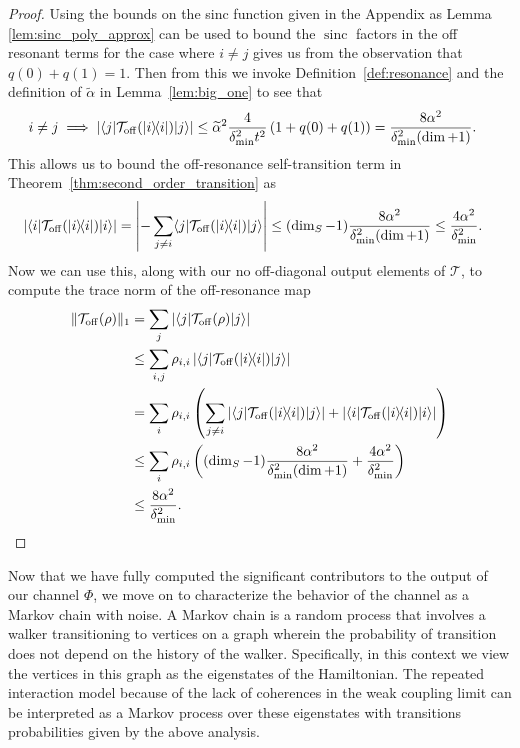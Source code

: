 \documentclass{article}
\newcommand{\off}{\rm off}
\newcommand{\ket}[1]{|#1\rangle}
\newcommand{\bra}[1]{\langle #1|}
\newcommand{\ketbra}[2]{| #1\rangle\! \langle #2|}
\newcommand{\abs}[1]{\left| #1 \right|}
\newcommand{\norm}[1]{\| #1 \|}
\DeclareMathOperator{\sinc}{sinc}
\begin{document}
\begin{proof}
Using the bounds on the sinc function given in the Appendix as Lemma \ref{lem:sinc_poly_approx} can be used to bound the $\sinc$ factors in the off resonant terms for the case where $i\ne j$ gives us from the observation that $q(0)+q(1) =1$.  Then from this we invoke Definition~\ref{def:resonance} and the definition of $\tilde{\alpha}$ in Lemma~\ref{lem:big_one} to see that
    \begin{align}
        i \neq j \implies \abs{\bra{j}\mathcal{T}_{\off}(\ketbra{i}{i})\ket{j}} &\le \widetilde{\alpha}^2\frac{4}{\delta_{\min}^2 t^2} \left( 1 + q(0) + q(1)\right) = \frac{8 \alpha^2}{\delta_{\min}^2(\dim + 1)}.
    \end{align}
    This allows us to bound the off-resonance self-transition term in Theorem~\ref{thm:second_order_transition} as
    \begin{align}
        \abs{\bra{i}\mathcal{T}_{\off}(\ketbra{i}{i})\ket{i}} &= \abs{- \sum_{j \neq i} \bra{j} \mathcal{T}_{\off}(\ketbra{i}{i}) \ket{j}} \le (\dim_S - 1) \frac{8 \alpha^2}{\delta_{\min}^2 (\dim + 1)} \le \frac{4 \alpha^2}{\delta_{\min}^2}.
    \end{align}
    Now we can use this, along with our no off-diagonal output elements of $\mathcal{T}$, to compute the trace norm of the off-resonance map
    \begin{align}
        \norm{\mathcal{T}_{\off}(\rho)}_1 &= \sum_{j} \abs{\bra{j} \mathcal{T}_{\off}(\rho) \ket{j}} \\
        &\le \sum_{i, j} \rho_{i,i} \abs{\bra{j}\mathcal{T}_{\off}(\ketbra{i}{i})\ket{j}} \\
        &= \sum_{i} \rho_{i,i} \left(\sum_{j \neq i} |\bra{j} \mathcal{T}_{\off}(\ketbra{i}{i}) \ket{j}| + |\bra{i} \mathcal{T}_{\off}(\ketbra{i}{i})\ket{i}| \right) \\
        &\le \sum_{i} \rho_{i,i} \left( (\dim_S - 1) \frac{8 \alpha^2}{\delta_{\min}^2(\dim + 1)} + \frac{4 \alpha^2}{\delta_{\min}^2} \right) \\
        &\le \frac{8 \alpha^2}{\delta_{\min}^2}.
    \end{align}
\end{proof}

Now that we have fully computed the significant contributors to the output of our channel $\Phi$, we move on to characterize the behavior of the channel as a Markov chain with noise. 
A Markov chain is a random process that involves a walker transitioning to vertices on a graph wherein the probability of transition does not depend on the history of the walker.  Specifically, in this context we view the vertices in this graph as the eigenstates of the Hamiltonian.  The repeated interaction model because of the lack of coherences in the weak coupling limit can be interpreted as a Markov process over these eigenstates with transitions probabilities given by the above analysis. 
\end{document}
